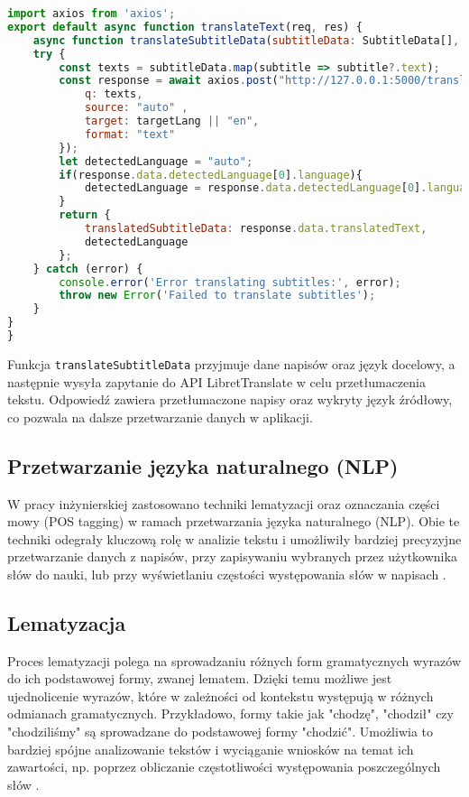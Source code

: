 \begin{lstlisting}[language=JavaScript, caption=Przykładowy kod integracji LibretTranslate w Next.js]
import axios from 'axios';
export default async function translateText(req, res) {
    async function translateSubtitleData(subtitleData: SubtitleData[], targetLang: string) {
    try {
        const texts = subtitleData.map(subtitle => subtitle?.text);
        const response = await axios.post("http://127.0.0.1:5000/translate", {
            q: texts,
            source: "auto" ,
            target: targetLang || "en",
            format: "text"
        });
        let detectedLanguage = "auto";
        if(response.data.detectedLanguage[0].language){
            detectedLanguage = response.data.detectedLanguage[0].language;
        }
        return {
            translatedSubtitleData: response.data.translatedText,
            detectedLanguage
        };
    } catch (error) {
        console.error('Error translating subtitles:', error);
        throw new Error('Failed to translate subtitles');
    }
}
}
\end{lstlisting}

Funkcja \texttt{translateSubtitleData} przyjmuje dane napisów oraz język docelowy, a następnie wysyła zapytanie do API LibretTranslate w celu przetłumaczenia tekstu. Odpowiedź zawiera przetłumaczone napisy oraz wykryty język źródłowy, co pozwala na dalsze przetwarzanie danych w aplikacji.

\subsection{Przetwarzanie języka naturalnego (NLP)}
W pracy inżynierskiej zastosowano techniki lematyzacji oraz oznaczania części mowy (POS tagging) w ramach przetwarzania języka naturalnego (NLP). Obie te techniki odegrały kluczową rolę w analizie tekstu i umożliwiły bardziej precyzyjne przetwarzanie danych z napisów, przy zapisywaniu wybranych przez użytkownika słów do nauki, lub przy wyświetlaniu częstości występowania słów w napisach \cite{NLPforNLP}.

\subsection*{Lematyzacja}
Proces lematyzacji polega na sprowadzaniu różnych form gramatycznych wyrazów do ich podstawowej formy, zwanej lematem. Dzięki temu możliwe jest ujednolicenie wyrazów, które w zależności od kontekstu występują w różnych odmianach gramatycznych. Przykładowo, formy takie jak "chodzę", "chodził" czy "chodziliśmy" są sprowadzane do podstawowej formy "chodzić". Umożliwia to bardziej spójne analizowanie tekstów i wyciąganie wniosków na temat ich zawartości, np. poprzez obliczanie częstotliwości występowania poszczególnych słów \cite{NLPforNLP}.

